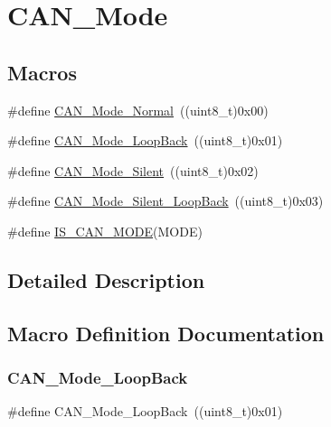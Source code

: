 \hypertarget{group___c_a_n___mode}{}\section{C\+A\+N\+\_\+\+Mode}
\label{group___c_a_n___mode}
\subsection*{Macros}
\begin{DoxyCompactItemize}
\item 
\#define \mbox{\hyperlink{group___c_a_n___mode_gaaf1f48ab4917ccfd5fd31dd781d59e29}{C\+A\+N\+\_\+\+Mode\+\_\+\+Normal}}~((uint8\+\_\+t)0x00)
\item 
\#define \mbox{\hyperlink{group___c_a_n___mode_gaad036c944403186eb3496ff65020c0ee}{C\+A\+N\+\_\+\+Mode\+\_\+\+Loop\+Back}}~((uint8\+\_\+t)0x01)
\item 
\#define \mbox{\hyperlink{group___c_a_n___mode_gac05e5d666f18eb35e8da70e6e17e8fb8}{C\+A\+N\+\_\+\+Mode\+\_\+\+Silent}}~((uint8\+\_\+t)0x02)
\item 
\#define \mbox{\hyperlink{group___c_a_n___mode_ga087afa0d24d2cf399225993573c984eb}{C\+A\+N\+\_\+\+Mode\+\_\+\+Silent\+\_\+\+Loop\+Back}}~((uint8\+\_\+t)0x03)
\item 
\#define \mbox{\hyperlink{group___c_a_n___mode_ga5d6480c240edeba383b4e07d65814d98}{I\+S\+\_\+\+C\+A\+N\+\_\+\+M\+O\+DE}}(M\+O\+DE)
\end{DoxyCompactItemize}


\subsection{Detailed Description}


\subsection{Macro Definition Documentation}
\mbox{\label{group___c_a_n___mode_gaad036c944403186eb3496ff65020c0ee}} 
\subsubsection{\texorpdfstring{CAN\_Mode\_LoopBack}{CAN\_Mode\_LoopBack}}
{\footnotesize\ttfamily \#define C\+A\+N\+\_\+\+Mode\+\_\+\+Loop\+Back~((uint8\+\_\+t)0x01)}

